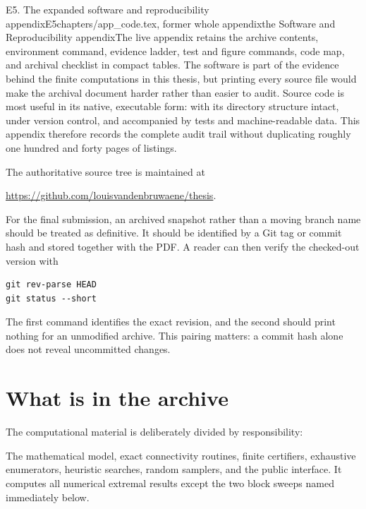 \begin{offcut}{E5. The expanded software and reproducibility appendix}{E5}{chapters/app\_code.tex, former whole appendix}{the Software and Reproducibility appendix}{The live appendix retains the archive contents, environment command, evidence ladder, test and figure commands, code map, and archival checklist in compact tables.}
The software is part of the evidence behind the finite computations in this thesis, but printing every source file would make the archival document harder rather than easier to audit. Source code is most useful in its native, executable form: with its directory structure intact, under version control, and accompanied by tests and machine-readable data. This appendix therefore records the complete audit trail without duplicating roughly one hundred and forty pages of listings.

The authoritative source tree is maintained at
\begin{center}
\url{https://github.com/louisvandenbruwaene/thesis}.
\end{center}
For the final submission, an archived snapshot rather than a moving branch name should be treated as definitive. It should be identified by a Git tag or commit hash and stored together with the PDF. A reader can then verify the checked-out version with
\begin{verbatim}
git rev-parse HEAD
git status --short
\end{verbatim}
The first command identifies the exact revision, and the second should print nothing for an unmodified archive. This pairing matters: a commit hash alone does not reveal uncommitted changes.

\section{What is in the archive}

The computational material is deliberately divided by responsibility:

\begin{description}[style=nextline]
  \item[\code{program/erdos915\_unified.py}]
  The mathematical model, exact connectivity routines, finite certifiers, exhaustive enumerators, heuristic searches, random samplers, and the public  interface. It computes all numerical extremal results except the two block sweeps named immediately below.


\end{description}
\end{offcut}
